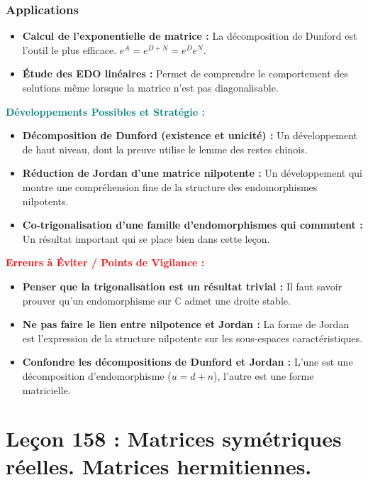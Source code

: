 \documentclass[12pt, a4paper, parskip=full]{report}
\theoremstyle{agregstyle}
\newenvironment{developpements}
  {\par\medskip\noindent\begin{oframed}\noindent\textbf{\textcolor{teal}{Développements Possibles et Stratégie :}}}
  {\end{oframed}\par\medskip}
\newenvironment{erreurs}
  {\par\medskip\noindent\begin{oframed}\noindent\textbf{\textcolor{red}{Erreurs à Éviter / Points de Vigilance :}}}
  {\end{oframed}\par\medskip}
\begin{document}
\subsection{Applications}
\begin{itemize}
    \item \textbf{Calcul de l'exponentielle de matrice :} La décomposition de Dunford est l'outil le plus efficace. $e^A = e^{D+N} = e^D e^N$.
    \item \textbf{Étude des EDO linéaires :} Permet de comprendre le comportement des solutions même lorsque la matrice n'est pas diagonalisable.
\end{itemize}

\begin{developpements}
    \begin{itemize}
        \item \textbf{Décomposition de Dunford (existence et unicité) :} Un développement de haut niveau, dont la preuve utilise le lemme des restes chinois.
        \item \textbf{Réduction de Jordan d'une matrice nilpotente :} Un développement qui montre une compréhension fine de la structure des endomorphismes nilpotents.
        \item \textbf{Co-trigonalisation d'une famille d'endomorphismes qui commutent :} Un résultat important qui se place bien dans cette leçon.
    \end{itemize}
\end{developpements}

\begin{erreurs}
    \begin{itemize}
        \item \textbf{Penser que la trigonalisation est un résultat trivial :} Il faut savoir prouver qu'un endomorphisme sur $\mathbb{C}$ admet une droite stable.
        \item \textbf{Ne pas faire le lien entre nilpotence et Jordan :} La forme de Jordan est l'expression de la structure nilpotente sur les sous-espaces caractéristiques.
        \item \textbf{Confondre les décompositions de Dunford et Jordan :} L'une est une décomposition d'endomorphisme ($u=d+n$), l'autre est une forme matricielle.
    \end{itemize}
\end{erreurs}
\chapter{Leçon 158 : Matrices symétriques réelles. Matrices hermitiennes.}
\end{document}
